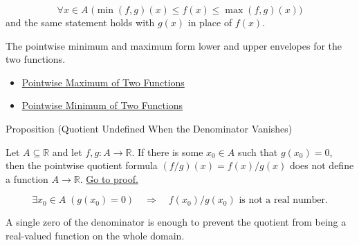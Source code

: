 \begin{remark*}
\[
  \forall x\in A\;
  \bigl(\min(f,g)(x)\leq f(x)\leq\max(f,g)(x)\bigr)
\]
and the same statement holds with \(g(x)\) in place of \(f(x)\).
\end{remark*}

\begin{remark*}[Interpretation]
The pointwise minimum and maximum form lower and upper envelopes for the two
functions.
\end{remark*}

\begin{dependencies}
\begin{itemize}
  \item \hyperref[def:pointwise-maximum-of-two-functions]{Pointwise Maximum of Two Functions}
  \item \hyperref[def:pointwise-minimum-of-two-functions]{Pointwise Minimum of Two Functions}
\end{itemize}
\end{dependencies}

\begin{propositionbox}{Proposition (Quotient Undefined When the Denominator Vanishes)}
\begin{proposition}
\label{prop:quotient-undefined-when-denominator-vanishes}
Let \(A\subseteq\mathbb{R}\) and let \(f,g:A\to\mathbb{R}\).  If there is
some \(x_0\in A\) such that \(g(x_0)=0\), then the pointwise quotient
formula \((f/g)(x)=f(x)/g(x)\) does not define a function \(A\to\mathbb{R}\).
\hyperref[prf:quotient-undefined-when-denominator-vanishes]{Go to proof.}
\end{proposition}
\end{propositionbox}

\begin{remark*}
\[
  \exists x_0\in A\;(g(x_0)=0)
  \quad\Longrightarrow\quad
  f(x_0)/g(x_0)\text{ is not a real number.}
\]
\end{remark*}

\begin{remark*}[Interpretation]
A single zero of the denominator is enough to prevent the quotient from being
a real-valued function on the whole domain.
\end{remark*}

